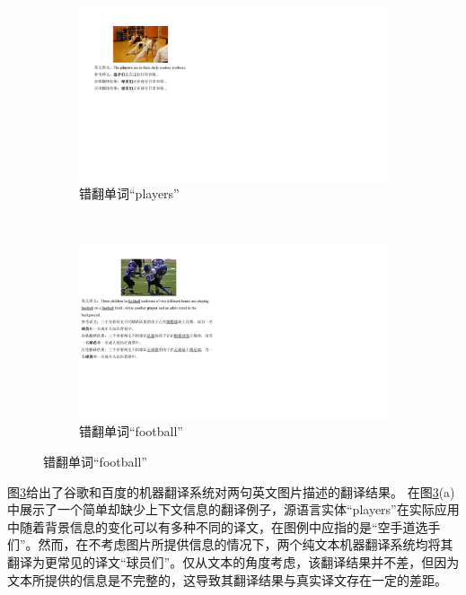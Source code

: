 \begin{figure}[!htbp]
    \centering
    \begin{subfigure}[b]{1\linewidth}
      \centering
      \includegraphics{Img/fig_1_case_players.pdf}
      \caption{错翻单词“players”}
      \label{fig:1_players}
    \end{subfigure}%
    \\
    \begin{subfigure}[b]{\linewidth}
      \centering
      \includegraphics{Img/fig_1_case_football.pdf}
      \caption{错翻单词“football”}
      \label{fig:1_football}
    \end{subfigure}
    \label{fig:1_translation_cases}
\end{figure}
图\ref{fig:1_translation_cases}给出了谷歌和百度的机器翻译系统对两句英文图片描述的翻译结果。
在图\ref{fig:1_translation_cases}(a)中展示了一个简单却缺少上下文信息的翻译例子，源语言实体“players”在实际应用中随着背景信息的变化可以有多种不同的译文，在图例中应指的是“空手道选手们”。然而，在不考虑图片所提供信息的情况下，两个纯文本机器翻译系统均将其翻译为更常见的译文“球员们”。仅从文本的角度考虑，该翻译结果并不差，但因为文本所提供的信息是不完整的，这导致其翻译结果与真实译文存在一定的差距。
